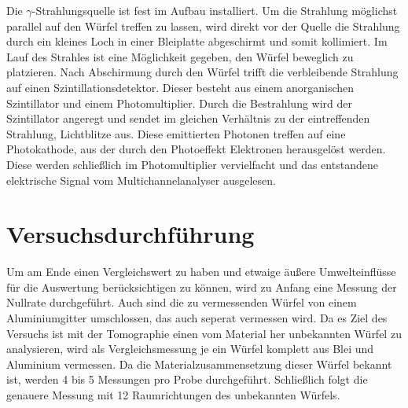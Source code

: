 Die $\gamma$-Strahlungsquelle ist fest im Aufbau installiert. Um die Strahlung möglichst parallel auf den Würfel treffen zu lassen, wird direkt vor der Quelle die Strahlung durch ein
kleines Loch in einer Bleiplatte abgeschirmt und somit kollimiert.
Im Lauf des Strahles ist eine Möglichkeit gegeben, den Würfel beweglich zu platzieren.
Nach Abschirmung durch den Würfel trifft die verbleibende Strahlung auf einen Szintillationsdetektor.
Dieser besteht aus einem anorganischen Szintillator und einem Photomultiplier.
Durch die Bestrahlung wird der Szintillator angeregt und sendet im gleichen Verhältnis zu der eintreffenden Strahlung, Lichtblitze aus.
Diese emittierten Photonen treffen auf eine Photokathode, aus der durch den Photoeffekt Elektronen herausgelöst werden.
Diese werden schließlich im Photomultiplier vervielfacht und das entstandene elektrische Signal vom Multichannelanalyser ausgelesen.

\section{Versuchsdurchführung}
Um am Ende einen Vergleichswert zu haben und etwaige äußere Umwelteinflüsse für die Auswertung berücksichtigen zu können, wird
zu Anfang eine Messung der Nullrate durchgeführt.
Auch sind die zu vermessenden Würfel von einem Aluminiumgitter umschlossen, das auch seperat vermessen wird.
Da es Ziel des Versuchs ist mit der Tomographie einen vom Material her unbekannten Würfel zu analysieren, wird
als Vergleichsmessung je ein Würfel komplett aus Blei und Aluminium vermessen.
Da die Materialzusammensetzung dieser Würfel bekannt ist, werden 4 bis 5 Messungen pro Probe durchgeführt.
Schließlich folgt die genauere Messung mit 12 Raumrichtungen des unbekannten Würfels.
